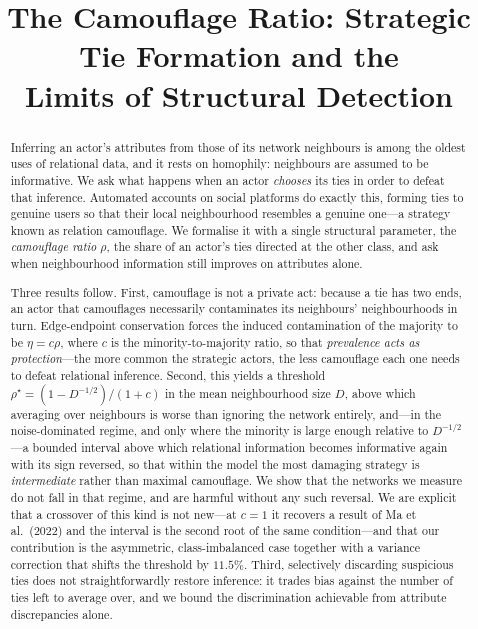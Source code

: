 \documentclass[preprint,12pt,authoryear]{elsarticle}
\theoremstyle{definition}
\begin{document}

\begin{frontmatter}

\title{The Camouflage Ratio: Strategic Tie Formation and the\\
       Limits of Structural Detection}

\begin{abstract}

Inferring an actor's attributes from those of its network neighbours is among the
oldest uses of relational data, and it rests on homophily: neighbours are assumed to
be informative. We ask what happens when an actor \emph{chooses} its ties in order to
defeat that inference. Automated accounts on social platforms do exactly this,
forming ties to genuine users so that their local neighbourhood resembles a genuine
one---a strategy known as relation camouflage. We formalise it with a single
structural parameter, the \emph{camouflage ratio} $\rho$, the share of an actor's
ties directed at the other class, and ask when neighbourhood information still
improves on attributes alone.

Three results follow. First, camouflage is not a private act: because a tie has two
ends, an actor that camouflages necessarily contaminates its neighbours'
neighbourhoods in turn. Edge-endpoint conservation forces the induced contamination
of the majority to be $\eta = c\rho$, where $c$ is the minority-to-majority ratio, so
that \emph{prevalence acts as protection}---the more common the strategic actors, the
less camouflage each one needs to defeat relational inference. Second, this yields a
threshold $\rho^\star = (1-D^{-1/2})/(1+c)$ in the mean neighbourhood size $D$, above
which averaging over neighbours is worse than ignoring the network entirely, and---in
the noise-dominated regime, and only where the minority is large enough relative to
$D^{-1/2}$---a bounded interval above which relational information becomes informative
again with its sign reversed, so that within the model the most damaging strategy is
\emph{intermediate} rather than maximal camouflage. We show that the networks we
measure do not fall in that regime, and are harmful without any such reversal. We are explicit that a crossover of this kind is not new---at $c = 1$ it
recovers a result of Ma et al.\ (2022) and the interval is the second root of the
same condition---and that our contribution is the asymmetric, class-imbalanced case
together with a variance correction that shifts the threshold by $11.5\%$. Third,
selectively discarding suspicious ties does not straightforwardly restore inference:
it trades bias against the number of ties left to average over, and we bound the
discrimination achievable from attribute discrepancies alone.


\end{abstract}
\end{frontmatter}
\end{document}
